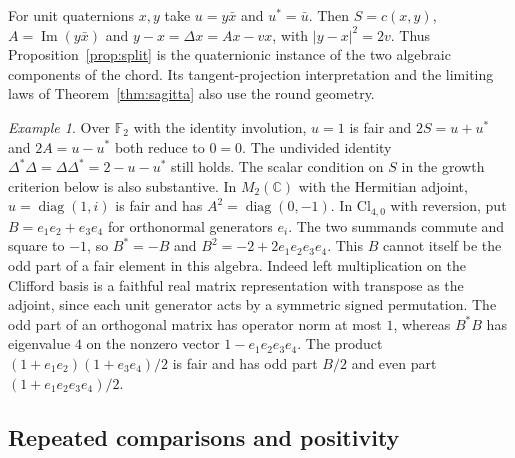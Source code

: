 \documentclass[11pt,reqno]{amsart}
\theoremstyle{definition}
\theoremstyle{remark}
\newtheorem{example}[theorem]{Example}
\numberwithin{equation}{section}
\begin{document}
For unit quaternions \(x,y\) take \(u=y\bar x\) and \(u^*=\bar u\).
Then \(S=c(x,y)\), \(A=\operatorname{Im}(y\bar x)\) and
\(y-x=\Delta x=Ax-vx\), with \(|y-x|^2=2v\). Thus
Proposition~\ref{prop:split} is the quaternionic instance of the two
algebraic components of the chord. Its tangent-projection interpretation
and the limiting laws of Theorem~\ref{thm:sagitta} also use the round
geometry.

\begin{example}\label{m1:algebra-boundaries}
Over \(\mathbb F_2\) with the identity involution, \(u=1\) is fair
and \(2S=u+u^*\) and \(2A=u-u^*\) both reduce to \(0=0\).
The undivided identity
\(\Delta^*\Delta=\Delta\Delta^*=2-u-u^*\) still holds. The scalar
condition on \(S\) in the growth criterion below is also substantive.
In \(M_2(\mathbb C)\) with the Hermitian adjoint,
\(u=\operatorname{diag}(1,i)\) is fair and has
\(A^2=\operatorname{diag}(0,-1)\). In \(\mathrm{Cl}_{4,0}\) with
reversion, put \(B=e_1e_2+e_3e_4\) for orthonormal generators \(e_i\).
The two summands commute and square to \(-1\), so
\(B^*=-B\) and \(B^2=-2+2e_1e_2e_3e_4\). This \(B\) cannot itself
be the odd part of a fair element in this algebra. Indeed left
multiplication on the Clifford basis is a faithful real matrix
representation with transpose as the adjoint, since each unit
generator acts by a symmetric signed permutation. The odd part of
an orthogonal matrix has operator norm at most \(1\), whereas \(B^*B\)
has eigenvalue \(4\) on the nonzero vector \(1-e_1e_2e_3e_4\). The product
\((1+e_1e_2)(1+e_3e_4)/2\) is fair and has odd part \(B/2\)
and even part \((1+e_1e_2e_3e_4)/2\).
\end{example}

\subsection{Repeated comparisons and positivity}
\end{document}
